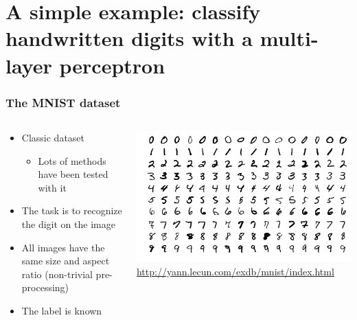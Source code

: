 \section{A simple example: classify handwritten digits with a multi-layer
  perceptron}

\begin{frame}
  \frametitle{The MNIST dataset}
  \begin{columns}
    \begin{column}{0.5\textwidth}
      \begin{itemize}
      \item Classic dataset
        \begin{itemize}
        \item Lots of methods have been tested with it
        \end{itemize}
      \item The task is to recognize the digit on the image
      \item All images have the same size and aspect ratio (non-trivial
        pre-processing)
      \item The label is known
      \end{itemize}
    \end{column}
    \begin{column}{0.5\textwidth}
      \includegraphics[width=\columnwidth]{img/MnistExamples.png}
      \url{http://yann.lecun.com/exdb/mnist/index.html}
    \end{column}
  \end{columns}
\end{frame}

